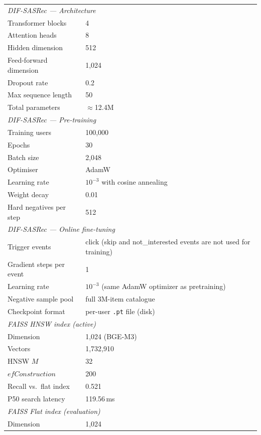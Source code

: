 \begin{longtable}{p{5.5cm} p{7.5cm}}
\multicolumn{2}{l}{\textit{DIF-SASRec — Architecture}} \\
Transformer blocks      & 4 \\
Attention heads         & 8 \\
Hidden dimension        & 512 \\
Feed-forward dimension  & 1{,}024 \\
Dropout rate            & 0.2 \\
Max sequence length     & 50 \\
Total parameters        & $\approx$12.4M \\
\hline
\multicolumn{2}{l}{\textit{DIF-SASRec — Pre-training}} \\
Training users          & 100{,}000 \\
Epochs                  & 30 \\
Batch size              & 2{,}048 \\
Optimiser               & AdamW \\
Learning rate           & $10^{-3}$ with cosine annealing \\
Weight decay            & 0.01 \\
Hard negatives per step & 512 \\
\hline
\multicolumn{2}{l}{\textit{DIF-SASRec — Online fine-tuning}} \\
Trigger events          & click (skip and not\_interested events are not used for training) \\
Gradient steps per event & 1 \\
Learning rate           & $10^{-3}$ (same AdamW optimizer as pretraining) \\
Negative sample pool    & full 3M-item catalogue \\
Checkpoint format       & per-user \texttt{.pt} file (disk) \\
\hline
\multicolumn{2}{l}{\textit{FAISS HNSW index (active)}} \\
Dimension               & 1{,}024 (BGE-M3) \\
Vectors                 & 1{,}732{,}910 \\
HNSW $M$                & 32 \\
$\mathit{efConstruction}$ & 200 \\
Recall vs.\ flat index  & 0.521 \\
P50 search latency      & 119.56\,ms \\
\hline
\multicolumn{2}{l}{\textit{FAISS Flat index (evaluation)}} \\
Dimension               & 1{,}024 \\

\end{longtable}
